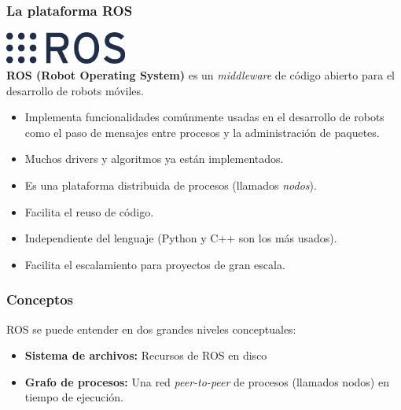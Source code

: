 \begin{frame}\frametitle{La plataforma ROS}
  \includegraphics[width=0.3\textwidth]{Figures/Ros_logo.png}
  \[\]
  \textbf{ROS (Robot Operating System) } es un \textit{middleware} de código abierto para el desarrollo de robots móviles.
  \begin{itemize}
  \item Implementa funcionalidades comúnmente usadas en el desarrollo de robots como el paso de mensajes entre procesos y la administración de paquetes.
  \item Muchos drivers y algoritmos ya están implementados.
  \item Es una plataforma distribuida de procesos (llamados \textit{nodos}).
  \item Facilita el reuso de código.
  \item Independiente del lenguaje (Python y C++ son los más usados).
  \item Facilita el escalamiento para proyectos de gran escala. 
  \end{itemize}
\end{frame}

\begin{frame}\frametitle{Conceptos}
  ROS se puede entender en dos grandes niveles conceptuales:
  \begin{itemize}
  \item \textbf{Sistema de archivos:} Recursos de ROS en disco
  \item \textbf{Grafo de procesos:} Una red \textit{peer-to-peer} de procesos (llamados nodos) en tiempo de ejecución.
  \end{itemize}
\end{frame}

